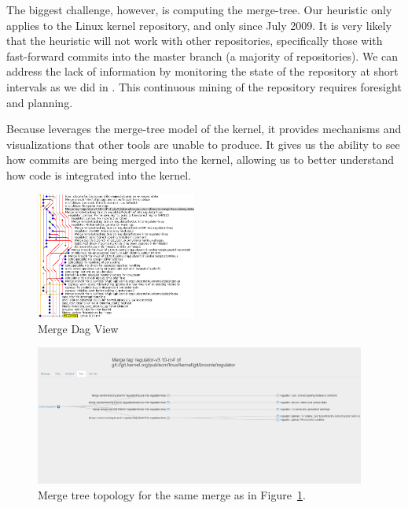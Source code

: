 \documentclass[conference, draftclsnofoot, draft]{IEEEtran}
\begin{document}
The biggest challenge, however, is computing the merge-tree. Our heuristic only
applies to the Linux kernel repository, and only since July 2009. It is very likely
that the heuristic will not work with other repositories, specifically those with
fast-forward commits into the master branch (a majority of repositories). We can
address the lack of information by monitoring the state of the repository at short
intervals as we did in \cite{German2015}. This continuous mining of the repository
requires foresight and planning.

Because \tool leverages the merge-tree model of the kernel, it provides mechanisms
and visualizations that other tools are unable to produce. It gives us the ability to
see how commits are being merged into the kernel, allowing us to better understand
how code is integrated into the kernel.

\begin{figure}
        \centering
        \includegraphics[width=0.47\textwidth]{figures/042dd_DAG.png}
        \caption{Merge Dag View}
        \label{fig:dag_view}
\end{figure}

\begin{figure}
        \centering
        \includegraphics[width=0.97\textwidth]{figures/042dd_tree.png}
        \caption{Merge tree topology for the same merge as in
                Figure~\ref{fig:dag_view}.}
        \label{fig:tree_view}
\end{figure}
\end{document}
